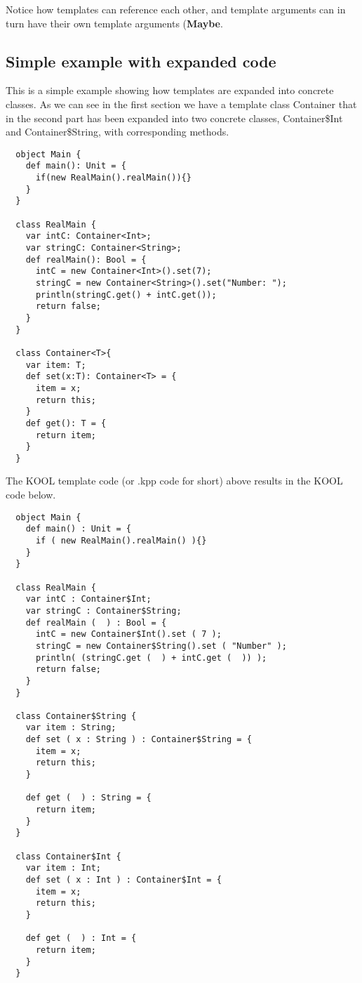 Notice how templates can reference each other, and template arguments can in
turn have their own template arguments (\textbf{Maybe}.


\subsection{Simple example with expanded code}

This is a simple example showing how templates are expanded into concrete
classes. As we can see in the first section we have a template class
Container that in the second part has been expanded into two concrete
classes, Container\$Int and Container\$String, with corresponding methods.

\begin{lstlisting}
  object Main {
    def main(): Unit = {
      if(new RealMain().realMain()){}
    }
  }

  class RealMain {
    var intC: Container<Int>;
    var stringC: Container<String>;
    def realMain(): Bool = {
      intC = new Container<Int>().set(7);
      stringC = new Container<String>().set("Number: ");
      println(stringC.get() + intC.get());
      return false;
    }
  }

  class Container<T>{
    var item: T;
    def set(x:T): Container<T> = {
      item = x;
      return this;
    }
    def get(): T = {
      return item;
    }
  }

\end{lstlisting}

The KOOL template code (or .kpp code for short) above results in the
KOOL code below.

\begin{lstlisting}
  object Main {
    def main() : Unit = {
      if ( new RealMain().realMain() ){}
    }
  }

  class RealMain {
    var intC : Container$Int;
    var stringC : Container$String;
    def realMain (  ) : Bool = {
      intC = new Container$Int().set ( 7 );
      stringC = new Container$String().set ( "Number" );
      println( (stringC.get (  ) + intC.get (  )) );
      return false;
    }
  }

  class Container$String {
    var item : String;
    def set ( x : String ) : Container$String = {
      item = x;
      return this;
    }

    def get (  ) : String = {
      return item;
    }
  }

  class Container$Int {
    var item : Int;
    def set ( x : Int ) : Container$Int = {
      item = x;
      return this;
    }

    def get (  ) : Int = {
      return item;
    }
  }

\end{lstlisting}
